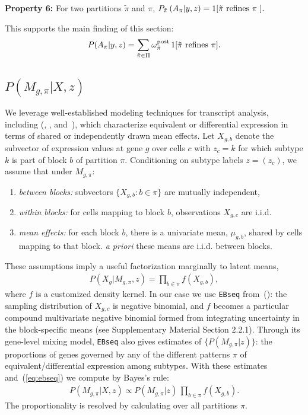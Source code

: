 \documentclass[aoas,preprint]{imsart}
\begin{document}
\noindent
{\bf Property 6:} For two partitions $\tilde \pi$ and $\pi$,  
$P_{\tilde \pi}\left( A_{\pi} | y,z \right) = 1[ {\mbox {\rm $\tilde \pi$ refines $\pi$ }}].$

This supports the main finding of this section:
\begin{eqnarray}
\label{eq:mainfinding}
P(A_\pi|y,z) = 
\sum_{\tilde \pi \in \Pi} \omega^{\rm post}_{\tilde \pi} \,  1[ {\mbox {\rm $\tilde \pi$ refines $\pi$}} ].
\end{eqnarray}


\subsection{$P(M_{g,\pi}|X,z)$}
We leverage well-established modeling techniques for transcript analysis, including
(\cite{ref:Leng}, \cite{Kendziorski:2003aa}, and~\cite{Jensen:2009aa}), which characterize
 equivalent or differential expression in terms of shared or independently drawn mean effects.  Let
$X_{g,b}$ denote
the subvector of expression values at gene $g$ over cells $c$ with $z_c=k$ for which subtype $k$ is part of
 block $b$ of partition $\pi$.  Conditioning on subtype labels $z=(z_c)$,  we assume that under $M_{g, \pi}$: 
\begin{enumerate}
\item {\em between blocks:} subvectors $\{ X_{g,b}: b \in \pi \}$ are mutually independent,
\item {\em within blocks:} for cells mapping to block $b$, observations $X_{g,c}$ are i.i.d. 
\item {\em mean effects:}  for each block $b$, there is a univariate mean,  $\mu_{g,b}$, 
 shared by cells mapping to that block.  {\em a priori} these means are i.i.d.  between blocks.
\end{enumerate}
These assumptions imply a useful factorization marginally to latent means,
\begin{eqnarray}
\label{eq:ebseq}
P(X_g|M_{g,\pi}, z) = \prod_{b \in \pi} f(X_{g,b}),
\end{eqnarray}
where $f$ is a customized density kernel.  In our case we use \verb+EBseq+ from~(\cite{ref:Leng}): 
the sampling distribution of
 $X_{g,c}$ is negative binomial, and $f$ becomes a particular compound multivariate 
negative binomial formed from integrating
uncertainty in the block-specific means (see Supplementary Material Section 2.2.1).  
Through its gene-level mixing model,
\verb+EBseq+ also gives estimates of $\{ P(M_{g,\pi}|z) \}$: the proportions of genes governed by any of the 
different patterns $\pi$ of equivalent/differential expression among subtypes. With these estimates 
and~(\ref{eq:ebseq}) we compute by Bayes's rule:
\begin{eqnarray*}
P(M_{g,\pi}|X,z) \propto P(M_{g,\pi}|z) \, \prod_{b \in \pi} f(X_{g,b}).
\end{eqnarray*}
The proportionality is resolved by calculating over all partitions $\pi$.
\end{document}

